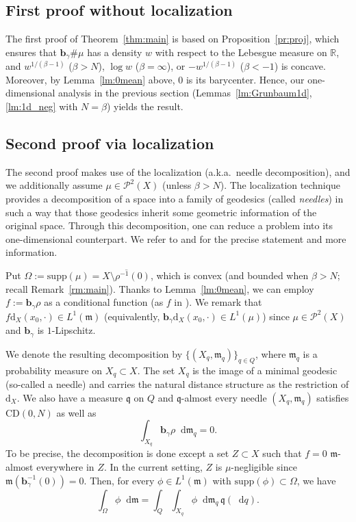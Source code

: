 \documentclass[sts]{imsart}
\theoremstyle{definition}
\theoremstyle{remark}
\newcommand{\R}{\mathbb{R}}
\newcommand{\bb}{\mathbf{b}}
\newcommand{\fm}{\mathfrak{m}}
\newcommand{\fq}{\mathfrak{q}}
\newcommand{\dist}{\mathrm{d}}
\newcommand{\lra}{\longrightarrow}
\newcommand{\CD}{\mathrm{CD}}
\newcommand{\supp}{\mathrm{supp}}
\newcommand*\diff{\mathop{}\!\mathrm{d}}
\begin{document}
\subsection{First proof without localization}\label{ssc:1st}%

The first proof of Theorem~\ref{thm:main} is based on Proposition~\ref{pr:proj}, which ensures that $\bb_\gamma\#\mu$ has a density $w$ with respect to the Lebesgue measure on $\R$, and $w^{1/(\beta -1)}$ ($\beta>N$), $\log w$ ($\beta=\infty$), or $-w^{1/(\beta-1)}$ ($\beta<-1$) is concave.
Moreover, by Lemma~\ref{lm:0mean} above, $0$ is its barycenter.
Hence, our one-dimensional analysis in the previous section (Lemmas~\ref{lm:Grunbaum1d}, \ref{lm:1d_neg} with $N=\beta$) yields the result.

\subsection{Second proof via localization}\label{ssc:2nd}%

The second proof makes use of the localization (a.k.a.\ needle decomposition), and we additionally assume $\mu \in \mathcal{P}^2(X)$ (unless $\beta>N$).
The localization technique provides a decomposition of a space into a family of geodesics (called \emph{needles}) in such a way that those geodesics inherit some geometric information of the original space.
Through this decomposition, one can reduce a problem into its one-dimensional counterpart.
We refer to \cite[Theorem~5.1]{CM} and \cite{Kl} for the precise statement and more information.

Put $\Omega:=\supp(\mu) =\overline{X \setminus \rho^{-1}(0)}$, which is convex (and bounded when $\beta>N$; recall Remark~\ref{rm:main}).
Thanks to Lemma~\ref{lm:0mean}, we can employ $f:=\bb_{\gamma}\rho$ as a conditional function (as $f$ in \cite[Theorem~5.1]{CM}).
We remark that $f \dist_X(x_0,\cdot) \in L^1(\fm)$ (equivalently, $\bb_\gamma \dist_X(x_0,\cdot) \in L^1(\mu)$)
since $\mu \in \mathcal{P}^2(X)$ and $\bb_{\gamma}$ is $1$-Lipschitz.

We denote the resulting decomposition by $\{(X_q,\fm_q)\}_{q \in Q}$,
where $\fm_q$ is a probability measure on $X_q \subset X$.
The set $X_q$ is the image of a minimal geodesic (so-called a needle) and carries the natural distance structure as the restriction of $\dist_X$.
We also have a measure $\fq$ on $Q$
and $\fq$-almost every needle $(X_q,\fm_q)$ satisfies $\CD(0,N)$ as well as
\begin{equation}\label{eq:1D}
\int_{X_q} \bb_{\gamma} \rho \diff\fm_q =0.
\end{equation}
To be precise, the decomposition is done except a set $Z \subset X$ such that $f=0$ $\fm$-almost everywhere in $Z$.
In the current setting, $Z$ is $\mu$-negligible since $\fm(\bb_{\gamma}^{-1}(0))=0$.
Then, for every $\phi \in L^1(\fm)$ with $\supp(\phi) \subset \Omega$, we have
\[
\int_\Omega \phi \diff\fm
=\int_Q \int_{X_q} \phi \diff\fm_q \,\fq(\diff q).
\]
\end{document}
